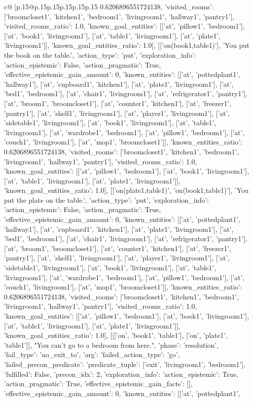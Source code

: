 \documentclass{article}
\begin{document}
{\begin{supertabular}{c@{$\;$}|p{.15\linewidth}@{}p{.15\linewidth}p{.15\linewidth}p{.15\linewidth}p{.15\linewidth}p{.15\linewidth}}
{{{0.6206896551724138, 'visited_rooms': ['broomcloset1', 'kitchen1', 'bedroom1', 'livingroom1', 'hallway1', 'pantry1'], 'visited_rooms_ratio': 1.0, 'known_goal_entities': [['at', 'pillow1', 'bedroom1'], ['at', 'book1', 'livingroom1'], ['at', 'table1', 'livingroom1'], ['at', 'plate1', 'livingroom1']], 'known_goal_entities_ratio': 1.0}}], [['on(book1,table1)'], 'You put the book on the table.', {'action_type': 'put', 'exploration_info': {'action_epistemic': False, 'action_pragmatic': True, 'effective_epistemic_gain_amount': 0, 'known_entities': [['at', 'pottedplant1', 'hallway1'], ['at', 'cupboard1', 'kitchen1'], ['at', 'plate1', 'livingroom1'], ['at', 'bed1', 'bedroom1'], ['at', 'chair1', 'livingroom1'], ['at', 'refrigerator1', 'pantry1'], ['at', 'broom1', 'broomcloset1'], ['at', 'counter1', 'kitchen1'], ['at', 'freezer1', 'pantry1'], ['at', 'shelf1', 'livingroom1'], ['at', 'player1', 'livingroom1'], ['at', 'sidetable1', 'livingroom1'], ['at', 'book1', 'livingroom1'], ['at', 'table1', 'livingroom1'], ['at', 'wardrobe1', 'bedroom1'], ['at', 'pillow1', 'bedroom1'], ['at', 'couch1', 'livingroom1'], ['at', 'mop1', 'broomcloset1']], 'known_entities_ratio': 0.6206896551724138, 'visited_rooms': ['broomcloset1', 'kitchen1', 'bedroom1', 'livingroom1', 'hallway1', 'pantry1'], 'visited_rooms_ratio': 1.0, 'known_goal_entities': [['at', 'pillow1', 'bedroom1'], ['at', 'book1', 'livingroom1'], ['at', 'table1', 'livingroom1'], ['at', 'plate1', 'livingroom1']], 'known_goal_entities_ratio': 1.0}}], [['on(plate1,table1)', 'on(book1,table1)'], 'You put the plate on the table.', {'action_type': 'put', 'exploration_info': {'action_epistemic': False, 'action_pragmatic': True, 'effective_epistemic_gain_amount': 0, 'known_entities': [['at', 'pottedplant1', 'hallway1'], ['at', 'cupboard1', 'kitchen1'], ['at', 'plate1', 'livingroom1'], ['at', 'bed1', 'bedroom1'], ['at', 'chair1', 'livingroom1'], ['at', 'refrigerator1', 'pantry1'], ['at', 'broom1', 'broomcloset1'], ['at', 'counter1', 'kitchen1'], ['at', 'freezer1', 'pantry1'], ['at', 'shelf1', 'livingroom1'], ['at', 'player1', 'livingroom1'], ['at', 'sidetable1', 'livingroom1'], ['at', 'book1', 'livingroom1'], ['at', 'table1', 'livingroom1'], ['at', 'wardrobe1', 'bedroom1'], ['at', 'pillow1', 'bedroom1'], ['at', 'couch1', 'livingroom1'], ['at', 'mop1', 'broomcloset1']], 'known_entities_ratio': 0.6206896551724138, 'visited_rooms': ['broomcloset1', 'kitchen1', 'bedroom1', 'livingroom1', 'hallway1', 'pantry1'], 'visited_rooms_ratio': 1.0, 'known_goal_entities': [['at', 'pillow1', 'bedroom1'], ['at', 'book1', 'livingroom1'], ['at', 'table1', 'livingroom1'], ['at', 'plate1', 'livingroom1']], 'known_goal_entities_ratio': 1.0}}], [[['on', 'book1', 'table1'], ['on', 'plate1', 'table1']], "You can't go to a bedroom from here.", {'phase': 'resolution', 'fail_type': 'no_exit_to', 'arg': {'failed_action_type': 'go', 'failed_precon_predicate': {'predicate_tuple': ['exit', 'livingroom1', 'bedroom1'], 'fulfilled': False, 'precon_idx': 2}}, 'exploration_info': {'action_epistemic': True, 'action_pragmatic': True, 'effective_epistemic_gain_facts': [], 'effective_epistemic_gain_amount': 0, 'known_entities': [['at', 'pottedplant1', }}}
\end{supertabular}}
\end{document}
